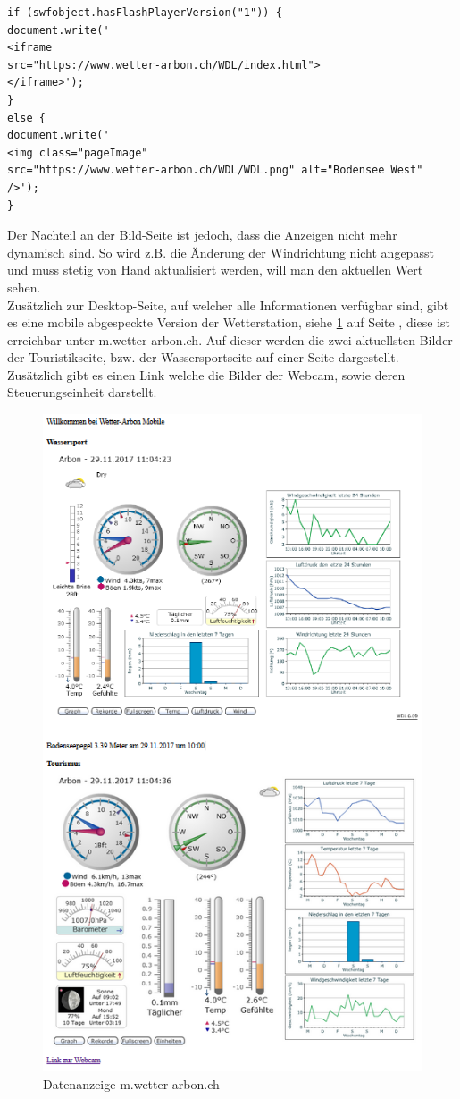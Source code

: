 \documentclass[a4paper,ngerman, 11pt, pagesize]{report}
\begin{document}
\begin{lstlisting}
if (swfobject.hasFlashPlayerVersion("1")) {
document.write('
<iframe 
src="https://www.wetter-arbon.ch/WDL/index.html">
</iframe>');
} 
else {
document.write('
<img class="pageImage" 
src="https://www.wetter-arbon.ch/WDL/WDL.png" alt="Bodensee West" 
/>');
}
\end{lstlisting}

Der Nachteil an der Bild-Seite ist jedoch, dass die Anzeigen nicht mehr dynamisch sind. So wird z.B. die Änderung der Windrichtung nicht angepasst und muss stetig von Hand aktualisiert werden, will man den aktuellen Wert sehen.\\

Zusätzlich zur Desktop-Seite, auf welcher alle Informationen verfügbar sind, gibt es eine mobile abgespeckte Version der Wetterstation, siehe \ref{img:mobilewebseite} auf Seite \pageref{img:mobilewebseite}, diese ist erreichbar unter m.wetter-arbon.ch. Auf dieser werden die zwei aktuellsten Bilder der Touristikseite, bzw. der Wassersportseite auf einer Seite dargestellt. Zusätzlich gibt es einen Link welche die Bilder der Webcam, sowie deren Steuerungseinheit darstellt.
\begin{figure}[htbp]
	\centering
	\includegraphics[width=0.9\linewidth]{img/mobile_webseite}
	\caption{Datenanzeige m.wetter-arbon.ch}
	\label{img:mobilewebseite}
\end{figure}
\end{document}
